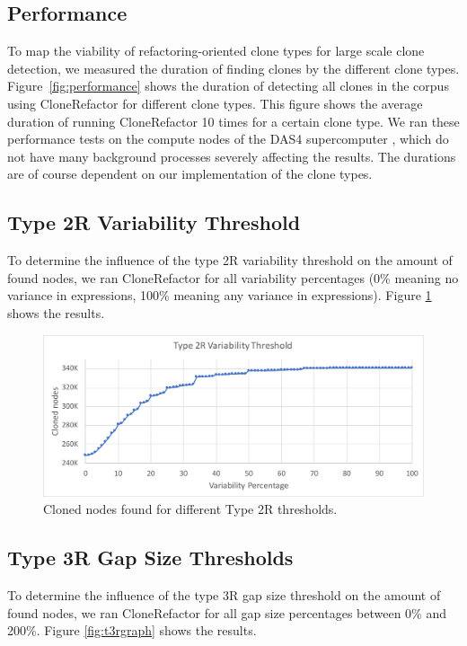 \subsection{Performance}
To map the viability of refactoring-oriented clone types for large scale clone detection, we measured the duration of finding clones by the different clone types. Figure~\ref{fig:performance} shows the duration of detecting all clones in the corpus using CloneRefactor for different clone types. This figure shows the average duration of running CloneRefactor 10 times for a certain clone type. We ran these performance tests on the compute nodes of the DAS4 supercomputer \cite{bal2016medium}, which do not have many background processes severely affecting the results. %
The durations are of course dependent on our implementation of the clone types.

\subsection{Type 2R Variability Threshold}
To determine the influence of the type 2R variability threshold on the amount of found nodes, we ran CloneRefactor for all variability percentages (0\% meaning no variance in expressions, 100\% meaning any variance in expressions). Figure \ref{fig:t2rgraph} shows the results.

\begin{figure}[H]
  \includegraphics[width=1\textwidth]{img/T2R}
  \caption{Cloned nodes found for different Type 2R thresholds.}
  \label{fig:t2rgraph}
\end{figure}

\subsection{Type 3R Gap Size Thresholds}
To determine the influence of the type 3R gap size threshold on the amount of found nodes, we ran CloneRefactor for all gap size percentages between 0\% and 200\%. Figure \ref{fig:t3rgraph} shows the results.

